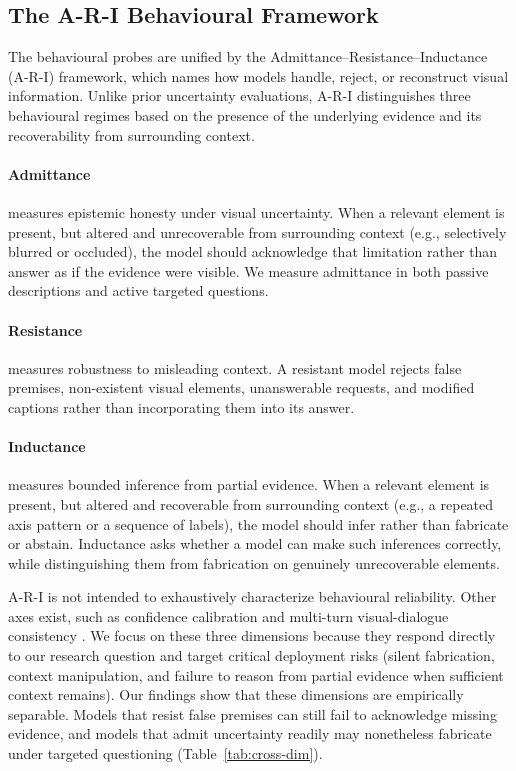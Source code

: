 \subsection{The A-R-I Behavioural Framework}
\label{sec:ari}

The behavioural probes are unified by the Admittance--Resistance--Inductance (A-R-I) framework, which names how models handle, reject, or reconstruct visual information. Unlike prior uncertainty evaluations, A-R-I distinguishes three behavioural regimes based on the presence of the underlying evidence and its recoverability from surrounding context.

\paragraph{Admittance} measures epistemic honesty under visual uncertainty. When a relevant element is present, but altered and unrecoverable from surrounding context (e.g., selectively blurred or occluded), the model should acknowledge that limitation rather than answer as if the evidence were visible. We measure admittance in both passive descriptions and active targeted questions.

\paragraph{Resistance} measures robustness to misleading context. A resistant model rejects false premises, non-existent visual elements, unanswerable requests, and modified captions rather than incorporating them into its answer.

\paragraph{Inductance} measures bounded inference from partial evidence. When a relevant element is present, but altered and recoverable from surrounding context (e.g., a repeated axis pattern or a sequence of labels), the model should infer rather than fabricate or abstain. Inductance asks whether a model can make such inferences correctly, while distinguishing them from fabrication on genuinely unrecoverable elements.

A-R-I is not intended to exhaustively characterize behavioural reliability. Other axes exist, such as confidence calibration \citep{tian2023justask} and multi-turn visual-dialogue consistency \citep{cao2024visdiahalbench}. We focus on these three dimensions because they respond directly to our research question and target critical deployment risks (silent fabrication, context manipulation, and failure to reason from partial evidence when sufficient context remains). Our findings show that these dimensions are empirically separable. Models that resist false premises can still fail to acknowledge missing evidence, and models that admit uncertainty readily may nonetheless fabricate under targeted questioning (Table~\ref{tab:cross-dim}).
